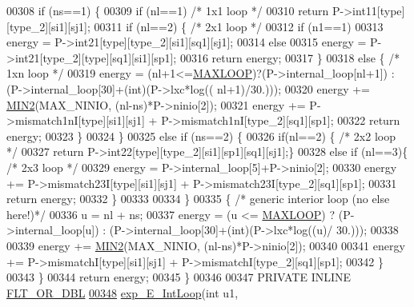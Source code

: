 \begin{DoxyCode}
00308     \textcolor{keywordflow}{if} (ns==1) \{
00309       \textcolor{keywordflow}{if} (nl==1)                    \textcolor{comment}{/* 1x1 loop */}
00310         \textcolor{keywordflow}{return} P->int11[type][type\_2][si1][sj1];
00311       \textcolor{keywordflow}{if} (nl==2) \{                  \textcolor{comment}{/* 2x1 loop */}
00312         \textcolor{keywordflow}{if} (n1==1)
00313           energy = P->int21[type][type\_2][si1][sq1][sj1];
00314         \textcolor{keywordflow}{else}
00315           energy = P->int21[type\_2][type][sq1][si1][sp1];
00316         \textcolor{keywordflow}{return} energy;
00317       \}
00318       \textcolor{keywordflow}{else} \{  \textcolor{comment}{/* 1xn loop */}
00319         energy = (nl+1<=\hyperlink{energy__const_8h_ad1bd6eabac419670ddd3c9ed82145988}{MAXLOOP})?(P->internal\_loop[nl+1]) : (P->internal\_loop[30]+(int)(P->lxc*log((
      nl+1)/30.)));
00320         energy += \hyperlink{group__utils_ga2dd4a927a7f937f43a90c144d79107d8}{MIN2}(MAX\_NINIO, (nl-ns)*P->ninio[2]);
00321         energy += P->mismatch1nI[type][si1][sj1] + P->mismatch1nI[type\_2][sq1][sp1];
00322         \textcolor{keywordflow}{return} energy;
00323       \}
00324     \}
00325     \textcolor{keywordflow}{else} \textcolor{keywordflow}{if} (ns==2) \{
00326       \textcolor{keywordflow}{if}(nl==2)      \{              \textcolor{comment}{/* 2x2 loop */}
00327         \textcolor{keywordflow}{return} P->int22[type][type\_2][si1][sp1][sq1][sj1];\}
00328       \textcolor{keywordflow}{else} \textcolor{keywordflow}{if} (nl==3)\{              \textcolor{comment}{/* 2x3 loop */}
00329         energy = P->internal\_loop[5]+P->ninio[2];
00330         energy += P->mismatch23I[type][si1][sj1] + P->mismatch23I[type\_2][sq1][sp1];
00331         \textcolor{keywordflow}{return} energy;
00332       \}
00333 
00334     \}
00335     \{ \textcolor{comment}{/* generic interior loop (no else here!)*/}
00336       u = nl + ns;
00337       energy = (u <= \hyperlink{energy__const_8h_ad1bd6eabac419670ddd3c9ed82145988}{MAXLOOP}) ? (P->internal\_loop[u]) : (P->internal\_loop[30]+(int)(P->lxc*log((u)/
      30.)));
00338 
00339       energy += \hyperlink{group__utils_ga2dd4a927a7f937f43a90c144d79107d8}{MIN2}(MAX\_NINIO, (nl-ns)*P->ninio[2]);
00340 
00341       energy += P->mismatchI[type][si1][sj1] + P->mismatchI[type\_2][sq1][sp1];
00342     \}
00343   \}
00344   \textcolor{keywordflow}{return} energy;
00345 \}
00346 
00347 PRIVATE INLINE \hyperlink{group__data__structures_ga31125aeace516926bf7f251f759b6126}{FLT\_OR\_DBL}
\hypertarget{interior__loops_8h_source.tex_l00348}{}\hyperlink{group__loops_ga19f10a6a02bbd07f4cd27b16ac928ea3}{00348} \hyperlink{group__loops_ga19f10a6a02bbd07f4cd27b16ac928ea3}{exp\_E\_IntLoop}(\textcolor{keywordtype}{int} u1,

\end{DoxyCode}
